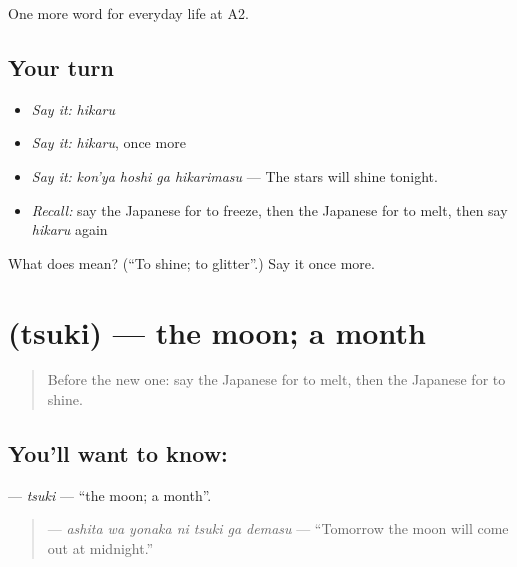 \begin{grammarlens}[title={What you've built}]
One more word for everyday life at A2.
\end{grammarlens}

\subsection*{Your turn}
\begin{itemize}
\raggedright
  \item \emph{Say it:} \emph{hikaru}
  \item \emph{Say it:} \emph{hikaru}, once more
  \item \emph{Say it:} \emph{kon'ya hoshi ga hikarimasu} — The stars will shine tonight.
  \item \emph{Recall:} say the Japanese for to freeze, then the Japanese for to melt, then say \emph{hikaru} again
\end{itemize}

\begin{tcolorbox}[breakable,colback=teal!4,colframe=teal!35!black,title={Before you move on}]
What does  mean? (\textquotedblleft{}To shine; to glitter\textquotedblright{}.) Say it once more.
\end{tcolorbox}
\section[\texorpdfstring{\ja{つき} (tsuki)}{つき (tsuki)}]{ (tsuki) — the moon; a month}

\label{lesson:JA-C213-tsuki}



\begin{quote}
Before the new one: say the Japanese for to melt, then the Japanese for to shine.
\end{quote}

\subsection*{You'll want to know: }
\textbf{} — \emph{tsuki} — \textquotedblleft{}the moon; a month\textquotedblright{}.

\begin{quote}
\textbf{   } — \emph{ashita wa yonaka ni tsuki ga demasu} — \textquotedblleft{}Tomorrow the moon will come out at midnight.\textquotedblright{}
\end{quote}

